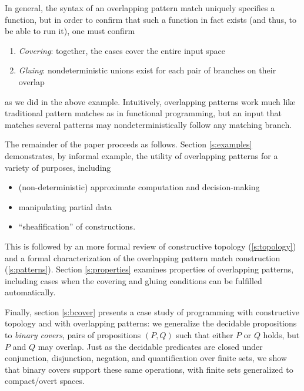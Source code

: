 \documentclass[conference]{IEEEtran}
\newcommand{\R}{\mathbb{R}}
\begin{document}
In general, the syntax of an overlapping pattern match uniquely specifies a function, but in order to confirm that such a function in fact exists (and thus, to be able to run it), one must confirm
\begin{enumerate}
\item \emph{Covering}: together, the cases cover the entire input space
\item \emph{Gluing}: nondeterministic unions exist for each pair of branches on their overlap
\end{enumerate}
as we did in the above example. Intuitively, overlapping patterns work much like traditional pattern matches as in functional programming, but an input that matches several patterns may nondeterministically follow any matching branch.


The remainder of the paper proceeds as follows. Section \ref{s:examples} demonstrates, by informal example, the utility of overlapping patterns for a variety of purposes, including
\begin{itemize}
\item (non-deterministic) approximate computation and decision-making
\item manipulating partial data
\item ``sheafification'' of constructions.
\end{itemize}

This is followed by an more formal review of constructive topology (\ref{s:topology}) and a formal characterization of the overlapping pattern match construction (\ref{s:patterns}). Section \ref{s:properties} examines properties of overlapping patterns, including cases when the covering and gluing conditions can be fulfilled automatically. 

Finally, section \ref{s:bcover} presents a case study of programming with constructive topology and with overlapping patterns: we generalize the decidable propositions to \emph{binary covers}, pairs of propositions $(P, Q)$ such that either $P$ or $Q$ holds, but $P$ and $Q$ may overlap. Just as the decidable predicates are closed under conjunction, disjunction, negation, and quantification over finite sets, we show that binary covers support these same operations, with finite sets generalized to compact/overt spaces.
\end{document}
